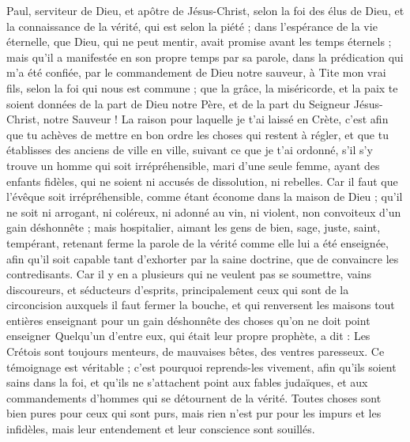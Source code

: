 \begin{multicols}{2}
\VerseOne{}Paul, serviteur de Dieu, et apôtre de Jésus-Christ, selon la foi des élus de Dieu, et la connaissance de la vérité, qui est selon la piété ;
dans l'espérance de la vie éternelle, que Dieu, qui ne peut mentir, avait promise avant les temps éternels ;
mais qu'il a manifestée en son propre temps par sa parole, dans la prédication qui m'a été confiée, par le commandement de Dieu notre sauveur,
à Tite mon vrai fils, selon la foi qui nous est commune ; que la grâce, la miséricorde, et la paix te soient données de la part de Dieu notre Père, et de la part du Seigneur Jésus-Christ, notre Sauveur !
La raison pour laquelle je t'ai laissé en Crète, c'est afin que tu achèves de mettre en bon ordre les choses qui restent à régler, et que tu établisses des anciens de ville en ville, suivant ce que je t'ai ordonné,
s'il s'y trouve un homme qui soit irrépréhensible, mari d'une seule femme, ayant des enfants fidèles, qui ne soient ni accusés de dissolution, ni rebelles.
Car il faut que l'évêque soit irrépréhensible, comme étant économe dans la maison de Dieu ; qu'il ne soit ni arrogant, ni coléreux, ni adonné au vin, ni violent, non convoiteux d'un gain déshonnête ;
mais hospitalier, aimant les gens de bien, sage, juste, saint, tempérant,
retenant ferme la parole de la vérité comme elle lui a été enseignée, afin qu'il soit capable tant d'exhorter par la saine doctrine, que de convaincre les contredisants.
Car il y en a plusieurs qui ne veulent pas se soumettre, vains discoureurs, et séducteurs d'esprits, principalement ceux qui sont de la circoncision
auxquels il faut fermer la bouche, et qui renversent les maisons tout entières enseignant pour un gain déshonnête des choses qu'on ne doit point enseigner 
Quelqu'un d'entre eux, qui était leur propre prophète, a dit : Les Crétois sont toujours menteurs, de mauvaises bêtes, des ventres paresseux.
Ce témoignage est véritable ; c'est pourquoi reprends-les vivement, afin qu'ils soient sains dans la foi,
et qu'ils ne s'attachent point aux fables judaïques, et aux commandements d'hommes qui se détournent de la vérité.
Toutes choses sont bien pures pour ceux qui sont purs, mais rien n'est pur pour les impurs et les infidèles, mais leur entendement et leur conscience sont souillés.

\end{multicols}
